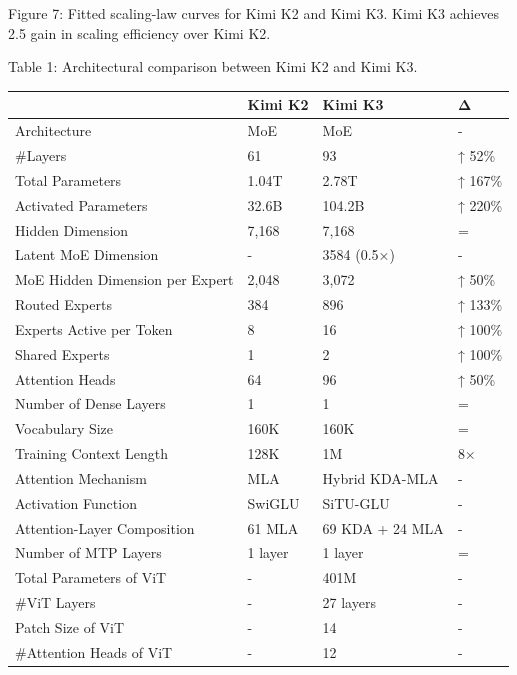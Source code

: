 \documentclass[
  10
]{article}
\newcounter{none} %
\begin{document}
Figure 7: Fitted scaling-law curves for Kimi K2 and Kimi K3. Kimi K3
achieves 2.5 gain in scaling efficiency over Kimi K2.

Table 1: Architectural comparison between Kimi K2 and Kimi K3.

{\def\LTcaptype{none} %
\begin{longtable}[]{@{}|l|l|l|l|@{}}
\toprule\noalign{}
\endhead
\bottomrule\noalign{}
\endlastfoot
\hline
& Kimi K2 & Kimi K3 & Δ \\
\hline
Architecture & MoE & MoE & - \\
\hline
\#Layers & 61 & 93 & ↑ 52\% \\
\hline
Total Parameters & 1.04T & 2.78T & ↑ 167\% \\
\hline
Activated Parameters & 32.6B & 104.2B & ↑ 220\% \\
\hline
Hidden Dimension & 7,168 & 7,168 & = \\
\hline
Latent MoE Dimension & - & 3584 (0.5×) & - \\
\hline
MoE Hidden Dimension per Expert & 2,048 & 3,072 & ↑ 50\% \\
\hline
Routed Experts & 384 & 896 & ↑ 133\% \\
\hline
Experts Active per Token & 8 & 16 & ↑ 100\% \\
\hline
Shared Experts & 1 & 2 & ↑ 100\% \\
\hline
Attention Heads & 64 & 96 & ↑ 50\% \\
\hline
Number of Dense Layers & 1 & 1 & = \\
\hline
Vocabulary Size & 160K & 160K & = \\
\hline
Training Context Length & 128K & 1M & 8× \\
\hline
Attention Mechanism & MLA & Hybrid KDA-MLA & - \\
\hline
Activation Function & SwiGLU & SiTU-GLU & - \\
\hline
Attention-Layer Composition & 61 MLA & 69 KDA + 24 MLA & - \\
\hline
Number of MTP Layers & 1 layer & 1 layer & = \\
\hline
Total Parameters of ViT & - & 401M & - \\
\hline
\#ViT Layers & - & 27 layers & - \\
\hline
Patch Size of ViT & - & 14 & - \\
\hline
\#Attention Heads of ViT & - & 12 & - \\
\hline
\end{longtable}
}
\end{document}
